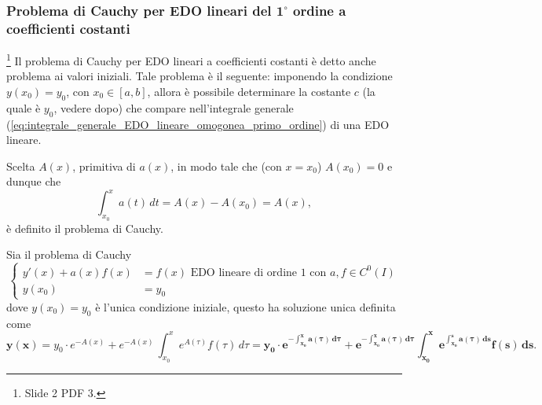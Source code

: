 \subsubsection{Problema di Cauchy per EDO lineari del \texorpdfstring{$\boldsymbol{1^{\circ}}$}{1°} ordine a coefficienti costanti}\label{ssec:problema_cauchy}

\footnote{Slide 2 PDF 3.} Il problema di Cauchy per EDO lineari a coefficienti costanti è detto anche problema ai valori iniziali. Tale problema è il seguente: imponendo la condizione $y(x_0)=y_0$, con $x_0\in[a,b]$, allora è possibile determinare la costante $c$ (la quale è $y_0$, vedere dopo) che compare nell'integrale generale (\ref{eq:integrale_generale_EDO_lineare_omogonea_primo_ordine}) di una EDO lineare.

Scelta $A(x)$, primitiva di $a(x)$, in modo tale che (con $x=x_0$) $A(x_0)=0$ e dunque che
\begin{equation}\label{eq:primitiva_problema_cauchy}
    \int_{x_0}^{x} a(t)\, dt = A(x) - A(x_0) = A(x),
\end{equation}
è definito il problema di Cauchy.
\begin{definition}
    Sia il problema di Cauchy 
    \begin{equation}\label{eq:problema_cauchy_edo_primo_ordine_coeff_costanti}
        \begin{cases}
            y'(x) + a(x)f(x)&=f(x)\text{ EDO lineare di ordine 1 con $a,f\in C^0(I)$}\\
            y(x_0)&=y_0
        \end{cases}
    \end{equation}
    dove $y(x_0)=y_0$ è l'unica condizione iniziale, questo ha soluzione unica definita come
    \begin{equation}\label{eq:soluzione_problema_cauchy_primo_ordine_coeff_costanti}
        \boldsymbol{y(x)} = y_0 \cdot e^{-A(x)} + e^{-A(x)} \, \int_{x_0}^x e^{A(\tau)}f(\tau) \, d\tau = \boldsymbol{y_0 \cdot e^{-\int_{x_0}^x a(\tau)\, d\tau} + e^{-\int_{x_0}^x a(\tau)\, d\tau} \int_{x_0}^x e^{\int_{x_0}^s a(\tau)\, ds} f(s)\, ds}.
    \end{equation}
\end{definition}

